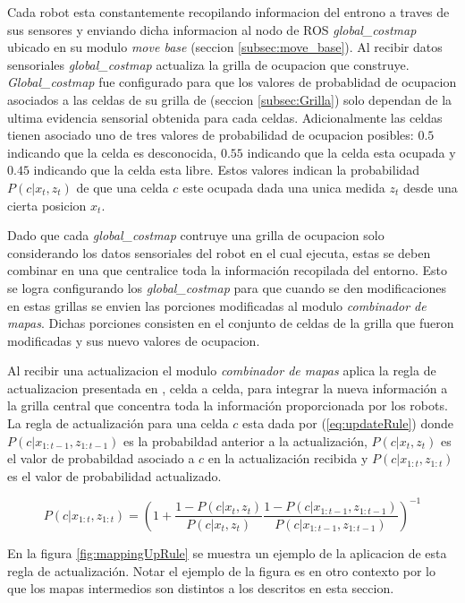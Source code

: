 Cada robot esta constantemente recopilando informacion del entrono a traves de
sus sensores y enviando dicha informacion al nodo de ROS \emph{global\_costmap}
ubicado en su modulo \emph{move base} (seccion \ref{subsec:move_base}). Al
recibir datos sensoriales \emph{global\_costmap} actualiza la grilla de
ocupacion que construye. \emph{Global\_costmap} fue configurado para que los
valores de probablidad de ocupacion asociados a las celdas de su grilla de
(seccion \ref{subsec:Grilla}) solo dependan de la ultima evidencia sensorial
obtenida para cada celdas. Adicionalmente las celdas tienen asociado uno de
tres valores de probabilidad de ocupacion posibles: $0.5$ indicando que la
celda es desconocida, $0.55$ indicando que la celda esta ocupada y $0.45$
indicando que la celda esta libre. Estos valores indican la probabilidad
$P(c|x_t,z_t)$ de que una celda $c$ este ocupada dada una unica medida $z_t$
desde una cierta posicion $x_t$.

Dado que cada \emph{global\_costmap} contruye una grilla de ocupacion solo
considerando los datos sensoriales del robot en el cual ejecuta, estas se deben
combinar en una que centralice toda la información recopilada del entorno. Esto
se logra configurando los \emph{global\_costmap} para que cuando se den
modificaciones en estas grillas se envien las porciones modificadas al modulo
\emph{combinador de mapas}. Dichas porciones consisten en el conjunto de celdas
de la grilla que fueron modificadas y sus nuevo valores de ocupacion.

Al recibir una actualizacion el modulo \emph{combinador de mapas} aplica la
regla de actualizacion presentada en \cite{stachniss2009robotic}, celda a
celda, para integrar la nueva información a la grilla central que concentra
toda la información proporcionada por los robots. La regla de actualización
para una celda $c$ esta dada
por (\ref{eq:updateRule}) donde $P(c|x_{1:t-1},z_{1:t-1})$ es la probabildad
anterior a la actualización, $P(c | x_t,z_t)$ es el valor de probabildad
asociado a $c$ en la actualización recibida y  $P(c|x_{1:t},z_{1:t})$ es el
valor de probabilidad actualizado. 

\begin{equation}
  P(c|x_{1:t},z_{1:t}) =\left( 1 + \frac{1 - P(c | x_t,z_t)}{P(c|x_t,z_t)} \frac{1 - P(c|x_{1:t-1},z_{1:t-1})}{P(c|x_{1:t-1},z_{1:t-1})} \right)^{-1}
\label{eq:updateRule}
\end{equation}

En la figura \ref{fig:mappingUpRule} se muestra un ejemplo de la aplicacion de
esta regla de actualización. Notar el ejemplo de la figura es en otro contexto
por lo que los mapas intermedios son distintos a los descritos en esta seccion.


